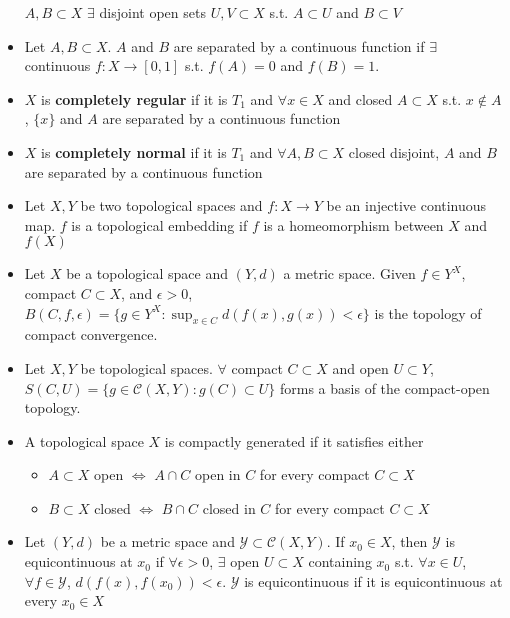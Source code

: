\documentclass[frenchspacing,9pt,landscape,a4paper]{article}
\theoremstyle{remark}
\begin{document}
\begin{multicols}{4}
\begin{itemize}
    $A,B\subset X$  $\exists$ disjoint open sets  $U,V\subset X$ s.t.  $A\subset U$ and  $B\subset V$    
\item Let $A,B\subset X$.  $A$ and  $B$ are separated by a continuous function if  $\exists$ continuous
    $f:X\to[0,1]$ s.t.  $f(A)=0$ and  $f(B)=1$.
\item  $X$ is \textbf{completely regular} if it is $T_1$ and $\forall x\in X$ and closed  $A\subset X$ s.t.
    $x\notin A$,  $\{x\}$ and  $A$ are separated by a continuous function
\item  $X$ is \textbf{completely normal} if it is $T_1$ and $\forall A,B\subset X$ closed disjoint,  $A$
    and  $B$ are separated by a continuous function
\item Let $X,Y$ be two topological spaces and  $f:X\to Y$ be an injective continuous map.  $f$ is a
    topological embedding if  $f$ is a homeomorphism between  $X$ and  $f(X)$    
\item Let $X$ be a topological space and  $(Y,d)$ a metric space. Given  $f\in Y^X$, compact  $C\subset X$,
    and  $\epsilon>0$,  $B(C,f,\epsilon)=\{g\in Y^X:\sup_{x\in C}{d(f(x),g(x))}<\epsilon\}$ is the topology
    of compact convergence.
\item Let $X,Y$ be topological spaces.  $\forall$ compact  $C\subset X$ and open $U\subset Y$,
    $S(C,U)=\{g\in\mathcal{C}(X,Y):g(C)\subset U\}$ forms a basis of the compact-open topology.
\item A topological space  $X$ is compactly generated if it satisfies either
     \begin{itemize}
         \item $A\subset X$ open  $\iff$  $A\cap C$ open in  $C$ for every compact  $C\subset X$
         \item  $B\subset X$ closed  $\iff$  $B\cap C$ closed in  $C$ for every compact  $C\subset X$
    \end{itemize}
\item Let $(Y,d)$ be a metric space and  $\mathcal{Y}\subset\mathcal{C}(X,Y)$. If  $x_0\in X$, then
    $\mathcal{Y}$ is equicontinuous at  $x_0$ if $\forall\epsilon>0$,  $\exists$ open  $U\subset X$
    containing  $x_0$ s.t. $\forall x\in U$,  $\forall f\in\mathcal{Y}$,  $d(f(x),f(x_0))<\epsilon$.
    $\mathcal{Y}$ is equicontinuous if it is equicontinuous at every  $x_0\in X$
\end{itemize}


\end{multicols}
\end{document}
